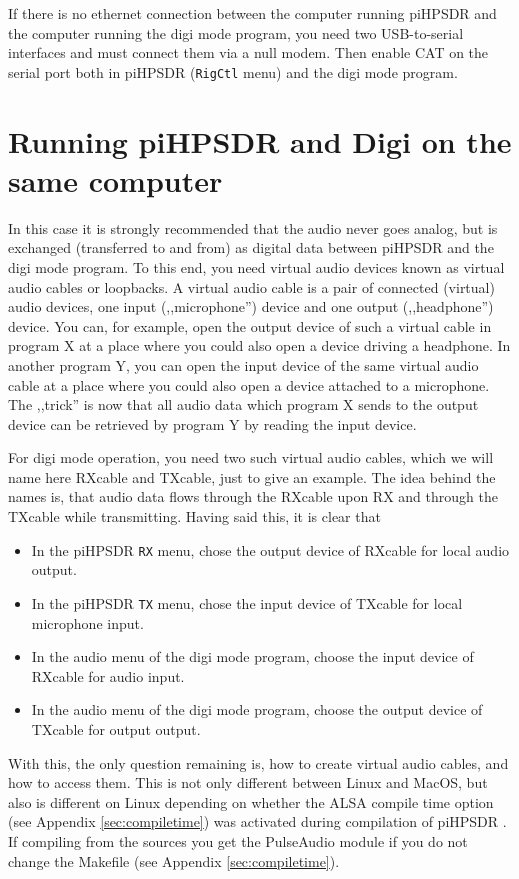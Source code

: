 \documentclass[12pt]{book}
\def\bltt#1{\texttt{\color{blue}#1}}
\def\pH{pi\-HPSDR }
\begin{document}
If there is no ethernet connection between the computer running \pH and the computer
running the digi mode program, you need two USB-to-serial interfaces and must connect them
via a null modem. Then enable CAT on the serial port both in \pH (\bltt{RigCtl} menu) and the
digi mode program.

\section[\pH and Digi on same computer]{Running \pH and Digi on the same computer}
In this case it is strongly recommended that the audio never goes analog, but is
exchanged (transferred to and from)
as digital data between \pH and the digi mode program. To this end, you need
virtual audio devices known as {\color{red} virtual audio cables} or {\color{red}
loopbacks}. A virtual audio cable is a pair of connected (virtual) audio devices,
one input (,,microphone'') device and one output (,,headphone'') device. You can,
for example, open the output device of such a virtual cable in program X at a place
where you could also open a device driving a headphone. In another program Y, you can
open the input device of the same virtual audio cable at a place where you could also
open a device attached to a microphone. The ,,trick'' is now that all audio data which
program X sends to the output device can be retrieved by program Y by reading the input device.



For digi mode operation, you need two such virtual audio cables, which we will name here
RXcable and TXcable, just to give an example. The idea behind the names is, that audio data
flows through the RXcable upon RX and through the TXcable while transmitting. Having said this,
it is clear that

\begin{itemize}
\item{In the \pH \bltt{RX} menu, chose the output device of RXcable for local audio output.}
\item{In the \pH \bltt{TX} menu, chose the input device of TXcable for local microphone input.}
\item{In the audio menu of the digi mode program, choose the input device of RXcable for audio input.}
\item{In the audio menu of the digi mode program, choose the output device of TXcable for output output.}
\end{itemize}

With this, the only question remaining is, how to create virtual audio cables, and how to access them.
This is not only different between Linux and MacOS, but also is different on Linux depending on
whether the ALSA compile time option (see Appendix \ref{sec:compiletime}) was activated during
compilation of \pH. If compiling from the sources you get the PulseAudio module if you
do not change the Makefile (see Appendix \ref{sec:compiletime}).
\end{document}
